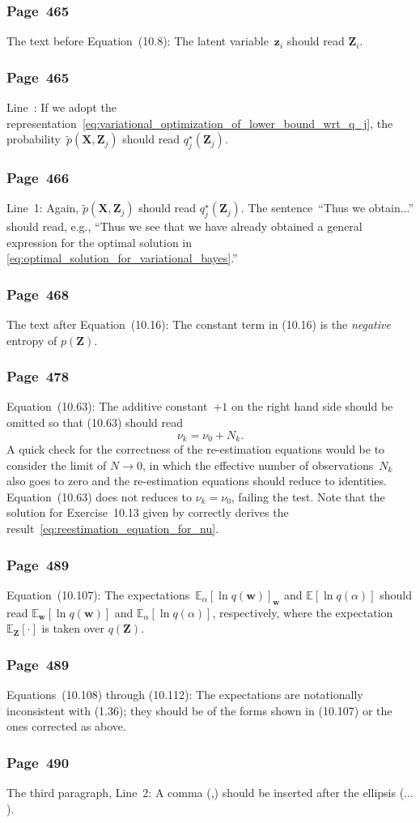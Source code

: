 \documentclass[12pt,a4paper]{article}
\newcommand{\erratum}[1]{\subsubsection*{#1}}
\begin{document}
\erratum{Page~465}
The text before Equation~(10.8):
The latent variable~$\mathbf{z}_i$ should read $\mathbf{Z}_i$.

\erratum{Page~465}
Line~:
If we adopt the representation~\eqref{eq:variational_optimization_of_lower_bound_wrt_q_j},
the probability~$\widetilde{p}(\mathbf{X}, \mathbf{Z}_j)$ should read
$q_j^{\star}\left(\mathbf{Z}_j\right)$.

\erratum{Page~466}
Line~1:
Again, $\widetilde{p}(\mathbf{X}, \mathbf{Z}_j)$ should read
$q_j^{\star}\left(\mathbf{Z}_j\right)$.
The sentence~``Thus we obtain...'' should read, e.g.,
``Thus we see that we have already obtained a general expression for the optimal solution in
\eqref{eq:optimal_solution_for_variational_bayes}.''

\erratum{Page~468}
The text after Equation~(10.16):
The constant term in (10.16) is the \emph{negative} entropy of $p(\mathbf{Z})$.

\erratum{Page~478}
Equation~(10.63):
The additive constant~$+1$ on the right hand side should be omitted so that
(10.63) should read
\begin{equation}
\nu_k = \nu_0 + N_k . \label{eq:reestimation_equation_for_nu}
\end{equation}
A quick check for the correctness of the re-estimation equations would be to consider
the limit of $N \to 0$, in which the effective number of observations~$N_k$ also goes to
zero and the re-estimation equations should reduce to identities.
Equation~(10.63) does not reduces to $\nu_k = \nu_0$, failing the test.
Note that the solution for Exercise~10.13 given by \citet{Svensen:PRML_web_solution} correctly
derives the result~\eqref{eq:reestimation_equation_for_nu}.

\erratum{Page~489}
Equation~(10.107):
The expectations~$\mathbb{E}_{\alpha}\left[ \ln q(\mathbf{w}) \right]_{\mathbf{w}}$ and
$\mathbb{E}\left[ \ln q(\alpha) \right]$ should read
$\mathbb{E}_{\mathbf{w}}\left[ \ln q(\mathbf{w}) \right]$ and
$\mathbb{E}_{\alpha}\left[ \ln q(\alpha) \right]$, respectively,
where the expectation~$\mathbb{E}_{\mathbf{Z}}[\cdot]$ is taken over $q\left(\mathbf{Z}\right)$.

\erratum{Page~489}
Equations~(10.108) through (10.112):
The expectations are notationally inconsistent with (1.36);
they should be of the forms shown in (10.107) or the ones corrected as above.

\erratum{Page~490}
The third paragraph, Line~2:
A comma (,) should be inserted after the ellipsis ($\dots$).
\end{document}
